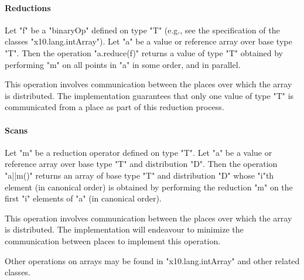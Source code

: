 \paragraph{Reductions}\label{ArrayReductions}

Let \xcd"f" be a \xcd"binaryOp" defined on type \xcd"T" (e.g., see
the specification of the classes \xcd"x10.lang.intArray").  Let
\xcd"a" be a value or reference array over base type \xcd"T". Then the
operation \xcd"a.reduce(f)" returns a value of type \xcd"T" obtained
by performing \xcd"m" on all points in \xcd"a" in some order, and in
parallel.

This operation involves communication between the places over which
the array is distributed. The \Xten{} implementation guarantees that
only one value of type \xcd"T" is communicated from a place as part of
this reduction process.

\paragraph{Scans}\label{ArrayScans}

Let \xcd"m" be a reduction operator defined on type \xcd"T". Let
\xcd"a" be a value or reference array over base type \xcd"T" and
distribution \xcd"D". Then the operation \xcd"a||m()" returns an array
of base type \xcd"T" and distribution \xcd"D" whose \xcd"i"th element
(in canonical order) is obtained by performing the reduction \xcd"m"
on the first \xcd"i" elements of \xcd"a" (in canonical order).

This operation involves communication between the places over which
the array is distributed. The \Xten{} implementation will endeavour to
minimize the communication between places to implement this operation.

Other operations on arrays may be found in \xcd"x10.lang.intArray" and
other related classes.
